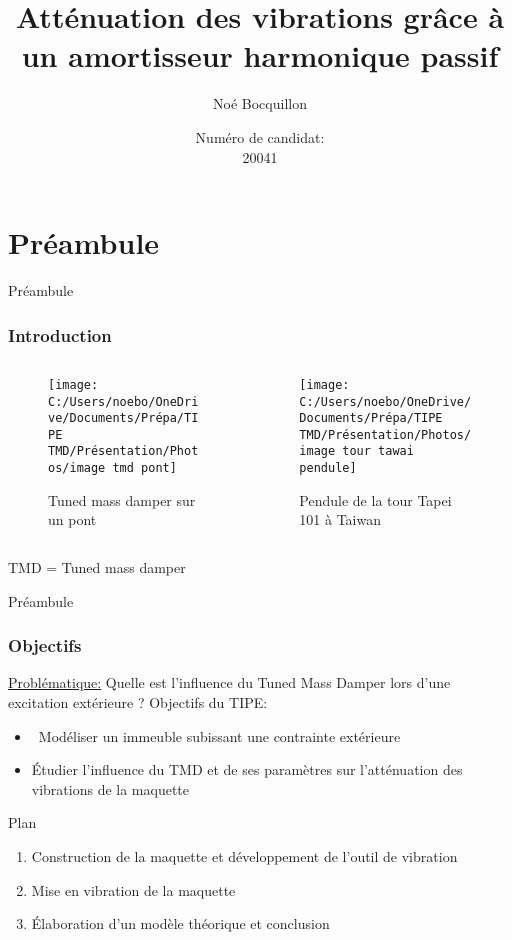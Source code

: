 \documentclass{beamer}
\title[]
{Atténuation des vibrations grâce à
	un amortisseur harmonique passif}
\subtitle{}
\author{Noé Bocquillon} %
\date[n°20041] %
{Numéro de candidat:\\ 20041}
\begin{document}
	
	\frame{\titlepage}
	\section{Préambule}
	\begin{frame}{Préambule}
		\frametitle{Introduction}
		
		
		\begin{columns}[T]
			\begin{column}{0.45\textwidth}
				\begin{figure}
					\centering
					\texttt{[image: C:/Users/noebo/OneDrive/Documents/Prépa/TIPE TMD/Présentation/Photos/image tmd pont]}
					\caption{Tuned mass damper sur un pont}
				\end{figure}
				
			\end{column}
			\begin{column}{0.45\textwidth}
				\begin{figure}
					\centering
					\caption{ Pendule de la tour Tapei 101 à Taiwan}
					\texttt{[image: C:/Users/noebo/OneDrive/Documents/Prépa/TIPE TMD/Présentation/Photos/image tour tawai pendule]}
				\end{figure}
			\end{column}
		\end{columns}
		\bigskip\small TMD = Tuned mass damper
	\end{frame}
	
	\begin{frame}{Préambule}
		\frametitle{Objectifs}
		\underline{Problématique:} Quelle est l'influence du Tuned Mass Damper lors d'une excitation extérieure ? 
		\vspace{12pt}
		\linebreak[3]Objectifs du TIPE:
		\begin{itemize}
			\item\ Modéliser un immeuble subissant une contrainte extérieure
			\item Étudier l'influence du TMD et de ses paramètres sur l'atténuation des vibrations de la maquette
			
		\end{itemize}
		
	\end{frame}
	
	\begin{frame}{Plan}
		\begin{enumerate}
			\item\huge{Construction de la maquette et développement de l'outil de vibration} \linebreak
			\item Mise en vibration de la maquette\linebreak
			\item Élaboration d'un modèle théorique et conclusion 
		\end{enumerate}
	\end{frame}
	
\end{document}

